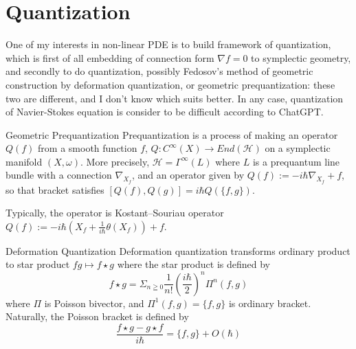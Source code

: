 \documentclass{article}
\begin{document}
\begin{definition}{}{}
\end{definition}


\begin{definition}{}{}
\end{definition}


\begin{definition}{}{}
\end{definition}




\section {Quantization}


\noindent
One of my interests in non-linear PDE is to build framework of quantization,
which is first of all embedding of connection form $\nabla f=0$ to symplectic geometry, and secondly to do quantization,
possibly Fedosov's method of geometric construction by deformation quantization, or geometric prequantization: 
these two are different, and I don't know which suits better.
In any case, quantization of Navier-Stokes equation is consider to be difficult according to ChatGPT. \\


\begin{definition}{Geometric Prequantization}{}
Prequantization is a process of making an operator $Q(f)$ from a smooth function $f$, $Q: C^\infty(X) \to End(\mathcal{H})$
on a symplectic manifold $(X,\omega)$.
More precisely, $\mathcal{H} = \Gamma^\infty(L)$ where $L$ is a prequantum line bundle with a connection $\nabla_{X_f}$,
and an operator given by $Q(f) := -i\hbar \nabla_{X_f} + f$, so that bracket satisfies $[Q(f),Q(g)] = i\hbar Q(\{f,g\})$. \\
\end{definition}

\noindent
Typically, the operator is Kostant–Souriau operator $Q(f) := -i\hbar (X_f + \frac{1}{i\hbar}\theta(X_f)) + f$. \\



\begin{definition}{Deformation Quantization}{}
Deformation quantization transforms ordinary product to star product $fg\mapsto f\star g$ where the star product is defined by
\[f\star g = \Sigma_{n\geqq 0} \frac{1}{n!} (\frac{i\hbar}{2})^n \Pi^n (f,g)\]
where $\Pi$ is Poisson bivector, and $\Pi^1(f,g) = \{f,g\}$ is ordinary bracket. Naturally, the Poisson bracket is defined by
\[\frac{f\star g - g\star f}{i\hbar} = \{f,g\} + O(\hbar) \]
\end{definition}
\end{document}

